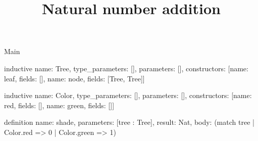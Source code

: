 \begin{lexlean}{Main}
\title{Natural number addition}
\begin{semanticmodule}
inductive{
  name: Tree,
  type_parameters: [],
  parameters: [],
  constructors: [{name: leaf, fields: []}, {name: node, fields: [Tree, Tree]}]
}

inductive{
  name: Color,
  type_parameters: [],
  parameters: [],
  constructors: [{name: red, fields: []}, {name: green, fields: []}]
}

definition{
  name: shade,
  parameters: [tree : Tree],
  result: Nat,
  body: (match tree | Color.red => 0 | Color.green => 1)
}
\end{semanticmodule}
\end{lexlean}
